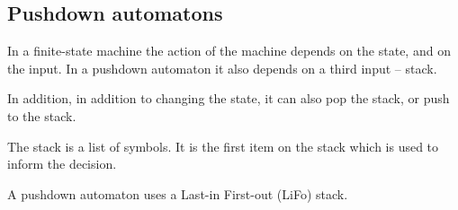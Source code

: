 
\subsection{Pushdown automatons}

In a finite-state machine the action of the machine depends on the state, and on the input. In a pushdown automaton it also depends on a third input – stack.

In addition, in addition to changing the state, it can also pop the stack, or push to the stack.

The stack is a list of symbols. It is the first item on the stack which is used to inform the decision.

A pushdown automaton uses a Last-in First-out (LiFo) stack.


